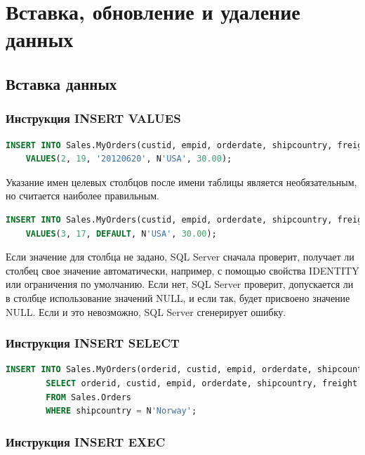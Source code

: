 \chapter{Вставка, обновление и удаление данных}

\section{Вставка данных}

\subsection{Инструкция INSERT VALUES}

\begin{lstlisting}[label=lst:funcReturn, language=sql]
	INSERT INTO Sales.MyOrders(custid, empid, orderdate, shipcountry, freight)
	VALUES(2, 19, '20120620', N'USA', 30.00);
\end{lstlisting}

Указание имен целевых столбцов после имени таблицы является необязательным,
но считается наиболее правильным.


\begin{lstlisting}[label=lst:funcReturn, language=sql]
	INSERT INTO Sales.MyOrders(custid, empid, orderdate, shipcountry, freight)
	VALUES(3, 17, DEFAULT, N'USA', 30.00); 
\end{lstlisting}

Если значение для столбца не задано, SQL Server сначала проверит, получает ли
столбец свое значение автоматически, например, с помощью свойства IDENTITY или
ограничения по умолчанию. Если нет, SQL Server проверит, допускается ли
в столбце использование значений NULL, и если так, будет присвоено значение NULL.
Если и это невозможно, SQL Server сгенерирует ошибку.


\subsection{Инструкция INSERT SELECT}

\begin{lstlisting}[label=lst:funcReturn, language=sql]
	INSERT INTO Sales.MyOrders(orderid, custid, empid, orderdate, shipcountry, freight)
		SELECT orderid, custid, empid, orderdate, shipcountry, freight
 		FROM Sales.Orders
 		WHERE shipcountry = N'Norway';
\end{lstlisting}

\subsection{Инструкция INSERT EXEC}


